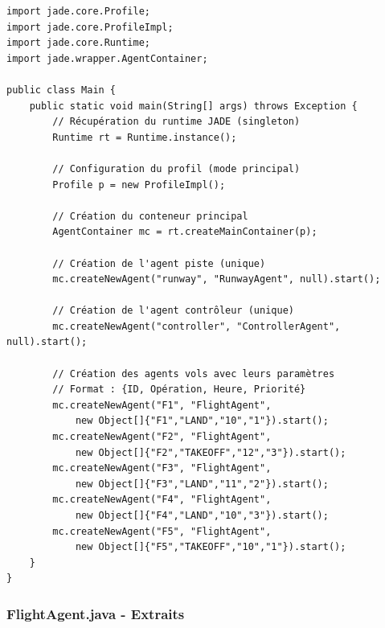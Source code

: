 \documentclass[12pt,a4paper]{article}
\begin{document}
\begin{lstlisting}[caption=Main.java - Initialisation du conteneur et des agents]
import jade.core.Profile;
import jade.core.ProfileImpl;
import jade.core.Runtime;
import jade.wrapper.AgentContainer;

public class Main {
    public static void main(String[] args) throws Exception {
        // Récupération du runtime JADE (singleton)
        Runtime rt = Runtime.instance();

        // Configuration du profil (mode principal)
        Profile p = new ProfileImpl();

        // Création du conteneur principal
        AgentContainer mc = rt.createMainContainer(p);

        // Création de l'agent piste (unique)
        mc.createNewAgent("runway", "RunwayAgent", null).start();

        // Création de l'agent contrôleur (unique)
        mc.createNewAgent("controller", "ControllerAgent", null).start();

        // Création des agents vols avec leurs paramètres
        // Format : {ID, Opération, Heure, Priorité}
        mc.createNewAgent("F1", "FlightAgent",
            new Object[]{"F1","LAND","10","1"}).start();
        mc.createNewAgent("F2", "FlightAgent",
            new Object[]{"F2","TAKEOFF","12","3"}).start();
        mc.createNewAgent("F3", "FlightAgent",
            new Object[]{"F3","LAND","11","2"}).start();
        mc.createNewAgent("F4", "FlightAgent",
            new Object[]{"F4","LAND","10","3"}).start();
        mc.createNewAgent("F5", "FlightAgent",
            new Object[]{"F5","TAKEOFF","10","1"}).start();
    }
}
\end{lstlisting}

\subsubsection{FlightAgent.java - Extraits}
\end{document}
